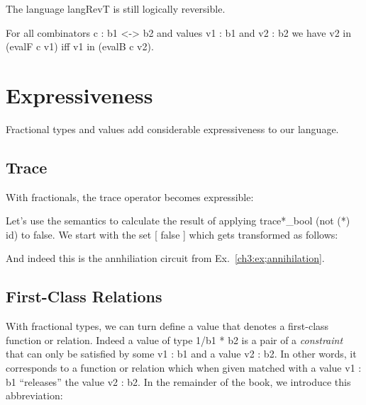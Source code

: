 \documentclass{llncs}
\begin{document}
The language {{langRevT}} is still logically reversible. 

\begin{proposition}
\label{chx:prop:logrev-tracep}
For all combinators {{c : b1 <-> b2}} and values {{v1 : b1}} and 
{{v2 : b2}} we have {{v2 in (evalF c v1)}} iff
{{v1 in (evalB c v2)}}.
\end{proposition}

\section{Expressiveness}

Fractional types and values add considerable expressiveness to our
language.

\subsection{Trace}

With fractionals, the trace operator becomes expressible:


Let's use the semantics to calculate the result of applying
{{trace*_{bool} (not (*) id)}} to {{false}}. We start
with the set {{ {[ false ]} }} which gets transformed as follows:

And indeed this is the annhiliation circuit from
Ex.~\ref{ch3:ex;annihilation}.

\subsection{First-Class Relations}

With fractional types, we can turn define a value that denotes a
first-class function or relation. Indeed a value of type {{1/b1 * b2}}
is a pair of a \emph{constraint} that can only be satisfied by some
{{v1 : b1}} and a value {{v2 : b2}}. In other words, it corresponds to
a function or relation which when given matched with a value {{v1 : b1}} 
``releases'' the value {{v2 : b2}}. In the remainder of the book, we 
introduce this abbreviation:
\end{document}
